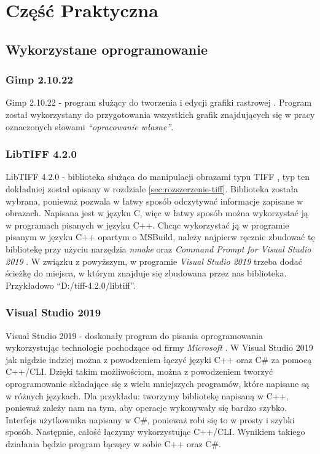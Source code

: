 \documentclass{article}
\begin{document}
    \section{Część Praktyczna}

        \subsection{Wykorzystane oprogramowanie}
        \subsubsection{Gimp 2.10.22}
        {
            \label{sec:gimp}
            \Large
            \justifying
            \quad
            Gimp 2.10.22 - program służący do tworzenia i edycji grafiki rastrowej \cite{Program GIMP}.
            Program został wykorzystany do przygotowania wszystkich grafik znajdujących się w pracy oznaczonych słowami \emph{``opracowanie własne''}.
        }
        \subsubsection{LibTIFF 4.2.0}
        {
            \label{sec:LibTIFF}
            \Large
            \justifying
            \quad
            LibTIFF 4.2.0 - biblioteka służąca do manipulacji obrazami typu TIFF \cite{Biblioteka LibTIFF}, typ ten dokładniej został opisany w rozdziale \ref{sec:rozszerzenie-tiff}.
            Biblioteka została wybrana, ponieważ pozwala w łatwy sposób odczytywać informacje zapisane w obrazach.
            Napisana jest w języku C, więc w łatwy sposób można wykorzystać ją w programach pisanych w języku C++.
            Chcąc wykorzystać ją w programie pisanym w języku C++ opartym o MSBuild, należy najpierw ręcznie zbudować tę bibliotekę przy użyciu narzędzia \textit{nmake} oraz \textit{Command Prompt for Visual Studio 2019} \cite{Building LibTiff}.
            W związku z powyższym, w programie \textit{Visual Studio 2019} trzeba dodać ścieżkę do miejsca, w którym znajduje się zbudowana przez nas biblioteka.
            Przykładowo ``D:/tiff-4.2.0/libtiff''.
        }
        \subsubsection{Visual Studio 2019}
        {
            \label{sec:VisualStudio2019}
            \Large
            \justifying
            \quad
            Visual Studio 2019 - doskonały program do pisania oprogramowania wykorzystując technologie pochodzące od firmy \emph{Microsoft} \cite{VS2019}.
            W Visual Studio 2019 jak nigdzie indziej można z powodzeniem łączyć języki C++ oraz C\# za pomocą C++/CLI.
            Dzięki takim możliwościom, można z powodzeniem tworzyć oprogramowanie składające się z wielu mniejszych programów, które napisane są w różnych językach.
            Dla przykładu: tworzymy bibliotekę napisaną w C++, ponieważ zależy nam na tym, aby operacje wykonywały się bardzo szybko.
            Interfejs użytkownika napisany w C\#, ponieważ robi się to w prosty i szybki sposób.
            Następnie, całość łączymy wykorzystując C++/CLI.
            Wynikiem takiego działania będzie program łączący w sobie C++ oraz C\#.
        }
        \newpage
\end{document}
